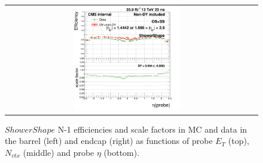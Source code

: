 \begin{figure}[bh]
\begin{center}
\begin{tabular}{cc}
      \includegraphics[width=0.45\textwidth]{figures/Zprime/2016/ScaleFactor/SameSign/N_1_eff/g_compare_cut_eta_Barrel+Endcap_ea_ta_inc_AS_N_1_Shower_PUW.png}
    \end{tabular}
    \caption{$ShowerShape$ N-1 efficiencies and scale factors in MC and data in the barrel (left) and endcap (right) as functions of probe $E_T$ (top), $N_{vtx}$ (middle) and probe $\eta$ (bottom).}
    \label{fig:Shower_2016}
  \end{center}
\end{figure}


